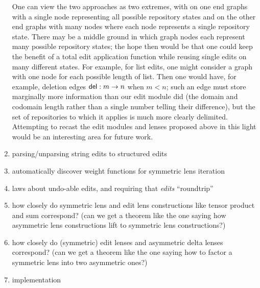 \begin{enumerate}
        One can view the two approaches as two extremes, with on one end
        graphs with a single node representing all possible repository
        states and on the other end graphs with many nodes where each node
        represents a single repository state. There may be a middle ground
        in which graph nodes each represent many possible repository states;
        the hope then would be that one could keep the benefit of a total
        edit application function while reusing single edits on many
        different states. For example, for list edits, one might consider a
        graph with one node for each possible length of list. Then one would
        have, for example, deletion edges $\mathsf{del} : m \to n$ when
        $m<n$; such an edge must store marginally more information than our
        edit module did (the domain and codomain length rather than a single
        number telling their difference), but the set of repositories to
        which it applies is much more clearly delimited. Attempting to
        recast the edit modules and lenses proposed above in this light
        would be an interesting area for future work.
    \item parsing/unparsing string edits to structured edits
    \item automatically discover weight functions for symmetric lens
        iteration
    \item laws about undo-able edits, and requiring that \emph{edits} ``roundtrip''
    \item how closely do symmetric lens and edit lens constructions like
        tensor product and sum correspond? (can we get a theorem like the
        one saying how asymmetric lens constructions lift to symmetric lens
        constructions?)
    \item how closely do (symmetric) edit lenses and asymmetric delta lenses
        correspond? (can we get a theorem like the one saying how to
        factor a symmetric lens into two asymmetric ones?)
    \item implementation
\end{enumerate}
